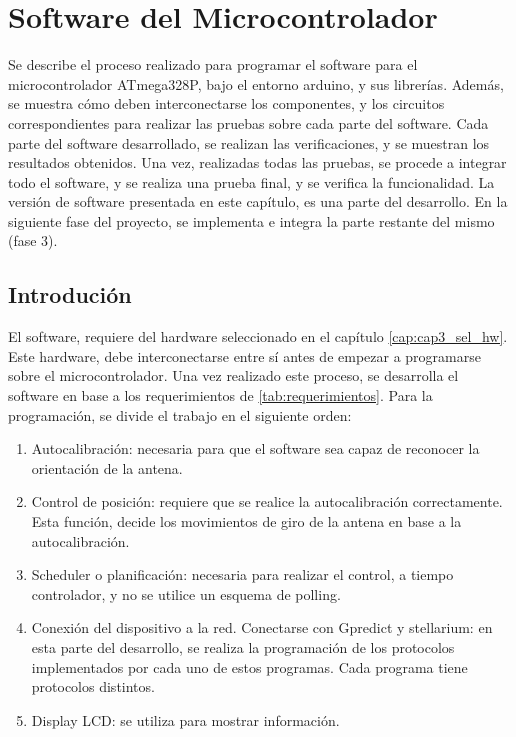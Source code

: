\renewcommand{\chaptername}{Software del microcontrolador}
\graphicspath{{parte_2/soft_micro/}}
\chapter{Software del Microcontrolador} 
\begin{center}
	\begin{tcolorbox}[colback=gray!5!white, %
		colframe=gray!75!black,
		title= \center{\Large{Resumen}} ]
		Se describe el proceso realizado para programar el software para el microcontrolador ATmega328P, bajo el entorno arduino, y sus librerías. Además, se muestra cómo deben interconectarse los componentes, y los circuitos correspondientes para realizar las pruebas sobre cada parte del software. Cada parte del software desarrollado, se realizan las verificaciones, y se muestran los resultados obtenidos. Una vez, realizadas todas las pruebas, se procede a integrar todo el software, y se realiza una prueba final, y se verifica la funcionalidad. La versión de software presentada en este capítulo, es una parte del desarrollo. En la siguiente fase del proyecto, se implementa e integra la parte restante del mismo (fase 3).   		 
 	\end{tcolorbox}
\end{center}    
\section{Introdución} 

	 El software, requiere del hardware seleccionado en el capítulo \ref{cap:cap3_sel_hw}. Este hardware, debe interconectarse entre sí antes de empezar a programarse sobre el microcontrolador. Una vez realizado este proceso, se desarrolla el software
	en base a los requerimientos de \ref{tab:requerimientos}. Para la programación, se divide el trabajo en el siguiente orden: 
	\begin{enumerate}
		\item Autocalibración: necesaria para que el software sea capaz de reconocer la orientación de la antena. 
		\item Control de posición: requiere que se realice la autocalibración correctamente. Esta función, decide los movimientos de giro de la antena en base a la autocalibración. 
		\item Scheduler o planificación: necesaria para realizar el control, a tiempo controlador, y no se utilice un esquema de polling.  
		\item Conexión del dispositivo a la red. Conectarse con Gpredict y stellarium: en esta parte del desarrollo, se realiza la programación de los protocolos implementados por cada uno de estos programas. Cada programa tiene protocolos distintos.
		\item Display LCD: se utiliza para mostrar información.  
	\end{enumerate}


